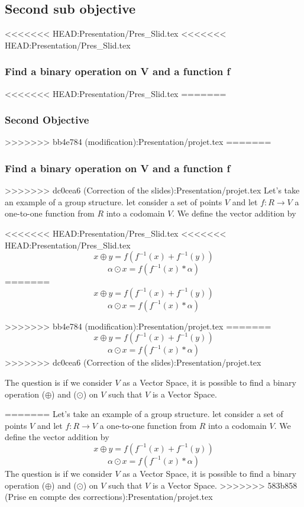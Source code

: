 \documentclass{beamer}
\begin{document}
\begin{frame}
\begin{frame}
\subsection{Second sub objective}
\begin{frame}
<<<<<<< HEAD:Presentation/Pres_Slid.tex
<<<<<<< HEAD:Presentation/Pres_Slid.tex
    \frametitle{Find a binary operation on V and a function f }
<<<<<<< HEAD:Presentation/Pres_Slid.tex
=======
    \frametitle{Second Objective}
>>>>>>> bb4e784 (modification):Presentation/projet.tex
=======
    \frametitle{Find a binary operation on V and a function f }
>>>>>>> dc0cea6 (Correction of the slides):Presentation/projet.tex
	Let's take an example of a group structure.
	let consider a set of points  $ V $ and let  $ f: R \rightarrow V $ a one-to-one
	function from $R$ into a codomain $V$. We define the vector addition by
	
<<<<<<< HEAD:Presentation/Pres_Slid.tex
<<<<<<< HEAD:Presentation/Pres_Slid.tex
    $$ x \oplus y = f(f^{-1}(x) + f^{-1}(y)) $$
    $$ \alpha \odot x = f(f^{-1}(x) * \alpha) $$
=======
     $$ x \oplus y = f(f^{-1}(x) + f^{-1}(y)) $$
     $$ \alpha \odot x = f(f^{-1}(x) * \alpha) $$
		
>>>>>>> bb4e784 (modification):Presentation/projet.tex
=======
    $$ x \oplus y = f(f^{-1}(x) + f^{-1}(y)) $$
    $$ \alpha \odot x = f(f^{-1}(x) * \alpha) $$
>>>>>>> dc0cea6 (Correction of the slides):Presentation/projet.tex

	The question is if we consider $V$ as a Vector Space, it is possible to find a binary operation ($\oplus$) and ($\odot$) on $V$ such that $V$ is a Vector Space.
	
=======
    Let's take an example of a group structure.
    let consider a set of points  $ V $ and let  $ f: R \rightarrow V $ a one-to-one
    function from $R$ into a codomain $V$. We define the vector addition by
    $$ x \oplus y = f(f^{-1}(x) + f^{-1}(y)) $$
    $$ \alpha \odot x = f(f^{-1}(x) * \alpha) $$
    The question is if we consider $V$ as a Vector Space, it is possible to find a binary operation ($\oplus$) and ($\odot$) on $V$ such that $V$ is a Vector Space.
>>>>>>> 583b858 (Prise en compte des corrections):Presentation/projet.tex
\end{frame}

\end{frame}
\end{frame}
\end{document}
